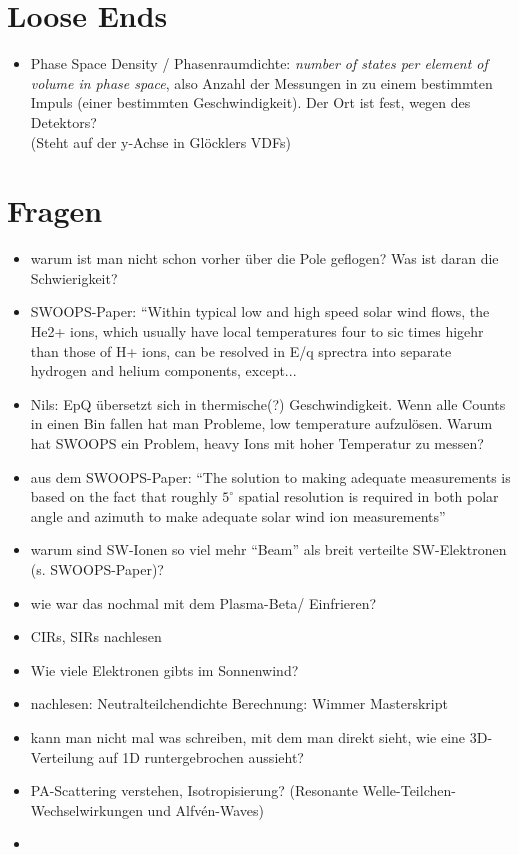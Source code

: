 \documentclass[]{article}
\begin{document}
\section{Loose Ends}
\begin{itemize}
	\item Phase Space Density / Phasenraumdichte: \textit{number of states per element of volume in phase space}, also Anzahl der Messungen in zu einem bestimmten Impuls (einer bestimmten Geschwindigkeit). Der Ort ist fest, wegen des Detektors?\\
	(Steht auf der y-Achse in Glöcklers VDFs)
\end{itemize}
%
%
%
\newpage
\section{Fragen}
\begin{itemize}
	\item warum ist man nicht schon vorher über die Pole geflogen? Was ist daran die Schwierigkeit?
	\item SWOOPS-Paper: “Within typical low and high speed solar wind flows, the He2+ ions, which usually have local temperatures four to sic times higehr than those of H+ ions, can be resolved in E/q sprectra into separate hydrogen and helium components, except...
	\item Nils: EpQ übersetzt sich in thermische(?) Geschwindigkeit. Wenn alle Counts in einen Bin fallen hat man Probleme, low temperature aufzulösen. Warum hat SWOOPS ein Problem,  heavy Ions mit hoher Temperatur zu messen? 
	\item aus dem SWOOPS-Paper: “The solution to making adequate measurements is based on the fact that roughly $5^\circ$ spatial resolution is required in both polar angle and azimuth to make adequate solar wind ion measurements”
	\item warum sind SW-Ionen so viel mehr “Beam” als breit verteilte SW-Elektronen (s. SWOOPS-Paper)?
	\item wie war das nochmal mit dem Plasma-Beta/ Einfrieren?
	\item CIRs, SIRs nachlesen
	\item Wie viele Elektronen gibts im Sonnenwind?
	\item nachlesen: Neutralteilchendichte Berechnung: Wimmer Masterskript
	\item kann man nicht mal was schreiben, mit dem man direkt sieht, wie eine 3D-Verteilung auf 1D runtergebrochen aussieht?
	\item PA-Scattering verstehen, Isotropisierung? (Resonante Welle-Teilchen-Wechselwirkungen und Alfvén-Waves)
	\item 
\end{itemize}
%
%
%
\end{document}
